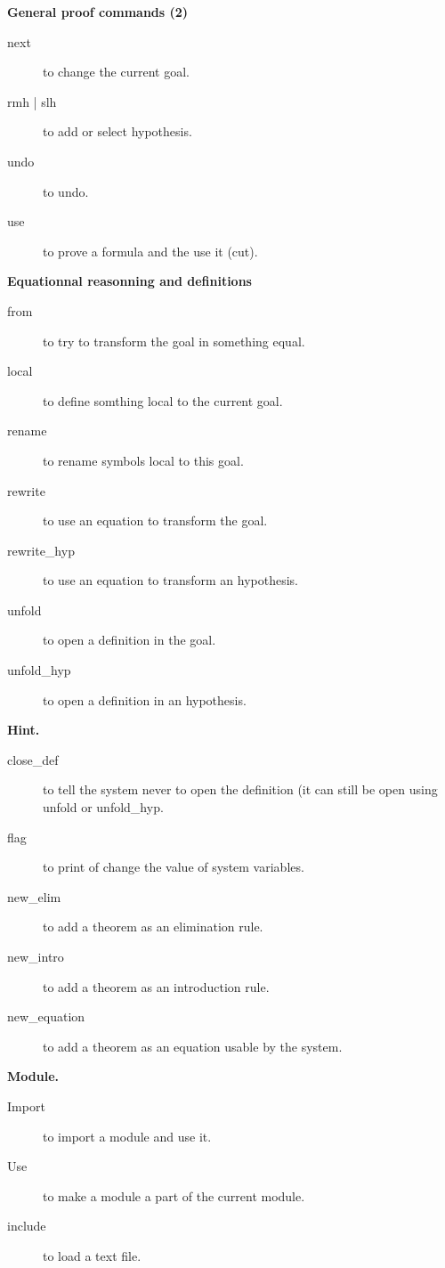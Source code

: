 \documentclass[long]{slides}
\begin{document}
\begin{slide}{\bf General proof commands (2)}
\begin{description}
\item[next] to change the current goal.
\item[rmh | slh] to add or select hypothesis.
\item[undo] to undo.
\item[use] to prove a formula and the use it (cut).
\end{description}
\end{slide}

\begin{slide}{\bf Equationnal reasonning and definitions}
\begin{description}
\item[from] to try to transform the goal in something equal.
\item[local] to define somthing local to the current goal.
\item[rename] to rename symbols local to this goal.
\item[rewrite] to use an equation to transform the goal.
\item[rewrite\_hyp] to use an equation to transform an hypothesis.
\item[unfold] to open a definition in the goal.
\item[unfold\_hyp] to open a definition in an hypothesis.
\end{description}
\end{slide}

\begin{slide}{\bf Hint.}
\begin{description}
\item[close\_def] to tell the system never to open the definition (it can
still be open using unfold or unfold\_hyp.
\item[flag] to print of change the value of system variables.
\item[new\_elim] to add a theorem as an elimination rule.
\item[new\_intro] to add a theorem as an introduction rule.
\item[new\_equation] to add a theorem as an equation usable by the system.
\end{description}
\end{slide}

\begin{slide}{\bf Module.}
\begin{description}
\item[Import] to import a module and use it.
\item[Use] to make a module a part of the current module.
\item[include] to load a text file.
\end{description}
\end{slide}
\end{document}

